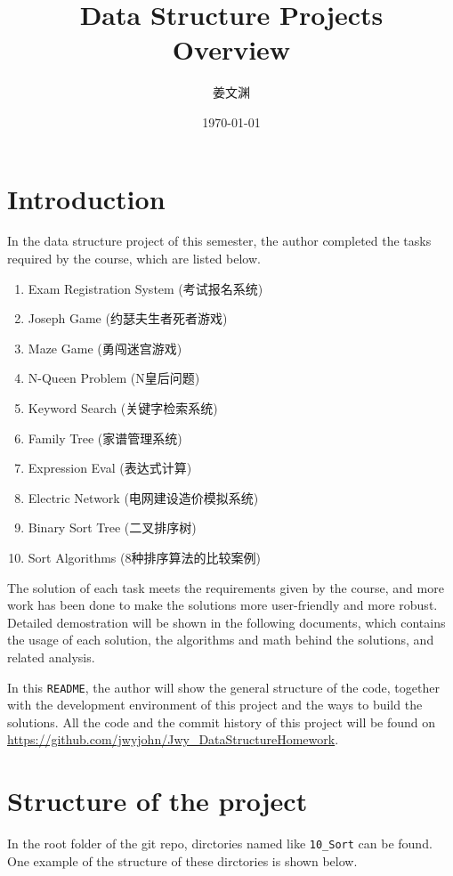 \documentclass[cn,black,12pt,normal]{elegantnote}
\title{Data Structure Projects\\Overview}
\author{姜文渊}
\institute{School of Software Engineering, Tongji University}
\date{\today}
\begin{document}
\maketitle

\section{Introduction}

In the data structure project of this semester, the author completed the tasks required by the course, which are listed below.

\begin{enumerate}
    \item Exam Registration System (考试报名系统)
    \item Joseph Game (约瑟夫生者死者游戏)
    \item Maze Game (勇闯迷宫游戏)
    \item N-Queen Problem (N皇后问题)
    \item Keyword Search (关键字检索系统)
    \item Family Tree (家谱管理系统)
    \item Expression Eval (表达式计算)
    \item Electric Network (电网建设造价模拟系统)
    \item Binary Sort Tree (二叉排序树)
    \item Sort Algorithms (8种排序算法的比较案例)
\end{enumerate}

The solution of each task meets the requirements given by the course, and more work has been done to make the solutions more user-friendly and more robust. Detailed demostration will be shown in the following documents, which contains the usage of each solution, the algorithms and math behind the solutions, and related analysis.

In this \lstinline{README}, the author will show the general structure of the code, together with the development environment of this project and the ways to build the solutions. All the code and the commit history of this project will be found on \url{https://github.com/jwyjohn/Jwy_DataStructureHomework}.

\section{Structure of the project}

In the root folder of the git repo, dirctories named like \lstinline{10_Sort} can be found. One example of the structure of these dirctories is shown below.
\end{document}
